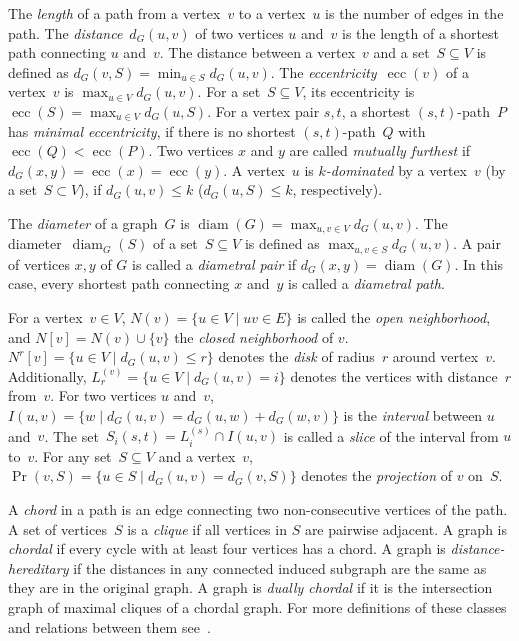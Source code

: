 \documentclass[10pt]{llncs}
\DeclareMathOperator{\ecc}{ecc}
\DeclareMathOperator{\diam}{diam}
\begin{document}
The \emph{length} of a path from a vertex~$v$ to a vertex~$u$ is the number of edges in the path. 
The \emph{distance}~$d_G(u,v)$ of two vertices $u$ and~$v$ is the length of a shortest path connecting $u$ and~$v$. 
The distance between a vertex~$v$ and a set~$S \subseteq V$ is defined as $d_G(v, S) = \min_{u \in S}  d_G(u, v)$. 
The \emph{eccentricity}~$\ecc(v)$ of a vertex~$v$ is $\max_{u \in V} d_G(u, v)$.
For a set~$S \subseteq V$, its eccentricity is $\ecc(S) = \max_{u \in V} d_G(u, S)$.
For a vertex pair $s,t$, a shortest $(s,t)$-path~$P$ has \emph{minimal eccentricity}, if there is no shortest $(s,t)$-path~$Q$ with $\ecc(Q) < \ecc(P)$.
Two vertices $x$ and $y$ are called \emph{mutually furthest} if $d_G(x,y) = \ecc(x) = \ecc(y)$. 
A vertex~$u$ is \emph{$k$-dominated} by a vertex~$v$ (by a set~$S \subset V$), if $d_G(u,v) \leq k$ ($d_G(u, S) \leq k$, respectively).

The \emph{diameter} of a graph~$G$ is $\diam(G) = \max_{u,v \in V} d_G(u, v)$. 
The diameter~$\diam_G(S)$ of a set~$S \subseteq V$ is defined as $\max_{u,v \in S} d_G(u, v)$. 
A pair of vertices $x,y$ of $G$ is called a \emph{diametral  pair} if $d_G(x, y) = \diam(G)$.
In this case, every shortest path connecting $x$ and~$y$ is called a \emph{diametral path}. 

For a vertex~$v \in V$, $N(v) = \{ u \in V \mid uv \in E \}$ is called the \emph{open neighborhood}, and $N[v] = N(v) \cup \{ v \}$ the \emph{closed neighborhood} of $v$. 
$N^r[v] = \{ u \in V \mid d_G(u,v) \leq r \}$ denotes the \emph{disk} of radius~$r$ around vertex~$v$. 
Additionally, $L_r^{(v)} = \{ u \in V \mid d_G(u,v) = i \}$ denotes the vertices with distance~$r$ from~$v$. 
For two vertices $u$ and~$v$, $I(u,v) = \{ w \mid d_G(u,v) = d_G(u,w) + d_G(w,v) \}$ is the \emph{interval} between $u$ and~$v$. 
The set~$S_i(s,t) = L_i^{(s)} \cap I(u,v)$ is called a \emph{slice} of the interval from $u$ to~$v$. 
For any set~$S \subseteq V$ and a vertex~$v$, $\Pr(v, S) = \{ u \in S \mid d_G(u, v) = d_G(v, S) \}$ denotes the \emph{projection} of $v$ on~$S$. 

A \emph{chord} in a path is an edge connecting two non-consecutive vertices of the path. 
A set of vertices~$S$ is a \emph{clique} if all vertices in $S$ are pairwise adjacent. 
A graph is \emph{chordal} if every cycle with at least four vertices has a chord. 
A graph is \emph{distance-hereditary} if the distances in any connected induced subgraph are the same as they are in the original graph. 
A graph is \emph{dually chordal} if it is the intersection graph of maximal cliques of a chordal graph.
For more definitions of these classes and relations between them see~\cite{BrLeSpinGraphClasses}.
\end{document}
